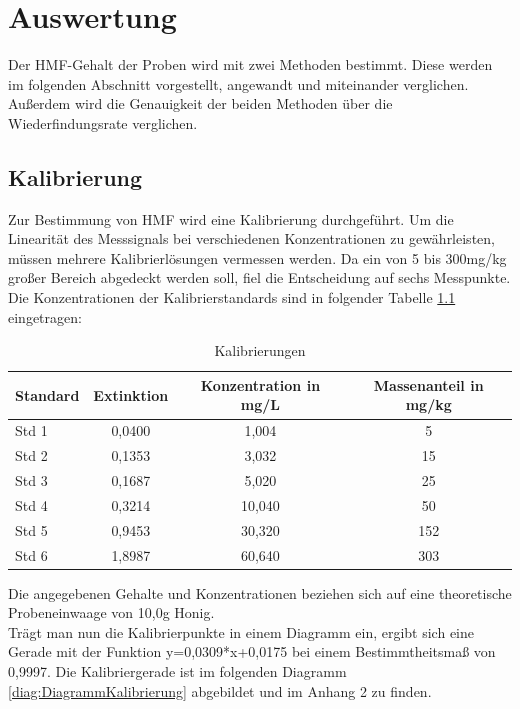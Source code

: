 \chapter{Auswertung}
Der HMF-Gehalt der Proben wird mit zwei Methoden bestimmt. Diese werden im folgenden Abschnitt vorgestellt, angewandt und miteinander verglichen. Außerdem wird die Genauigkeit der beiden Methoden über die Wiederfindungsrate verglichen.
\section{Kalibrierung}
Zur Bestimmung von HMF wird eine Kalibrierung durchgeführt. Um die Linearität des Messsignals bei verschiedenen Konzentrationen zu gewährleisten, müssen mehrere Kalibrierlösungen vermessen werden. Da ein von 5 bis 300mg/kg großer Bereich abgedeckt werden soll, fiel die Entscheidung auf sechs Messpunkte. Die Konzentrationen der Kalibrierstandards sind in folgender Tabelle \ref{tab:Kalibrierungen} eingetragen:

\begin{table}[htbp]
    \centering
    \caption{Kalibrierungen}
        \begin{tabular}{l|c|c|c}
            Standard & Extinktion & Konzentration in mg/L &  Massenanteil in mg/kg\\
            \hline
            Std 1 & 0,0400 & 1,004 & 5\\
            \hline
            Std 2 & 0,1353 & 3,032 & 15\\
            \hline
            Std 3 & 0,1687 & 5,020 & 25\\
            \hline
            Std 4 & 0,3214 & 10,040 & 50\\
            \hline
            Std 5 & 0,9453 & 30,320 & 152\\
            \hline
            Std 6 & 1,8987 & 60,640 & 303
        \end{tabular}
        \label{tab:Kalibrierungen}
\end{table}

Die angegebenen Gehalte und Konzentrationen beziehen sich auf eine theoretische Probeneinwaage von 10,0g Honig.\\
Trägt man nun die Kalibrierpunkte in einem Diagramm ein, ergibt sich eine Gerade mit der Funktion y=0,0309*x+0,0175 bei einem Bestimmtheitsmaß von 0,9997. Die Kalibriergerade ist im folgenden Diagramm \ref{diag:DiagrammKalibrierung} abgebildet und im Anhang 2 zu finden.

